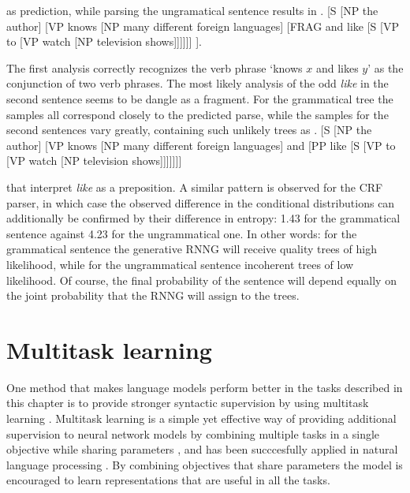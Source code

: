     as prediction, while parsing the ungramatical sentence results in
    \exi. [S [NP the author] [VP knows [NP many different foreign languages] [FRAG and like [S [VP to [VP watch [NP television shows]]]]]] ].

    The first analysis correctly recognizes the verb phrase `knows $x$ and likes $y$' as the conjunction of two verb phrases. The most likely analysis of the odd \textit{like} in the second sentence seems to be dangle as a fragment. For the grammatical tree the samples all correspond closely to the predicted parse, while  the samples for the second sentences vary greatly, containing such unlikely trees as
    \exi. [S [NP the author] [VP knows [NP many different foreign languages] and [PP like [S [VP to [VP watch [NP television shows]]]]]]]

    that interpret \textit{like} as a preposition. A similar pattern is observed for the CRF parser, in which case the observed difference in the conditional distributions can additionally be confirmed by their difference in entropy: 1.43 for the grammatical sentence against 4.23 for the ungrammatical one. In other words: for the grammatical sentence the generative RNNG will receive quality trees of high likelihood, while for the ungrammatical sentence incoherent trees of low likelihood. Of course, the final probability of the sentence will depend equally on the joint probability that the RNNG will assign to the trees.

\section{Multitask learning}
  One method that makes language models perform better in the tasks described in this chapter is to provide stronger syntactic supervision by using multitask learning \citep{enguehard2017multitask,linzen2018targeted}. Multitask learning is a simple yet effective way of providing additional supervision to neural network models by combining multiple tasks in a single objective while sharing parameters \citep{caruana1997multitask}, and has been succcesfully applied in natural language processing \citep{collobert2008unified,collobert2011natural,zhang2016multitask,goldberg2016multitask}. By combining objectives that share parameters the model is encouraged to learn representations that are useful in all the tasks.

